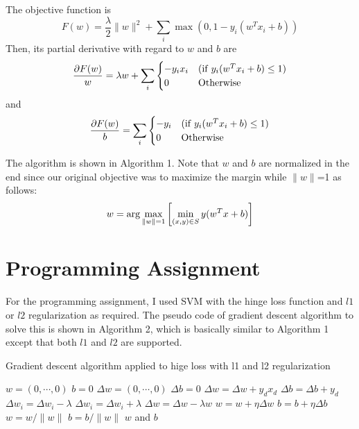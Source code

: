\begin{enumerate}
\begin{enumerate}
The objective function is
\[
F(w)=\frac{\lambda}{2}\|w\|^2+\sum_i \max{(0, 1-y_i (w^Tx_i+b))}
\]
Then, its partial derivative with regard to $w$ and $b$ are
\[
\frac{\partial F(w)}{w}=\lambda w+ \sum_i
\begin{cases}
-y_i x_i & ({\rm if} \; y_i(w^Tx_i+b) \le 1) \\
0 & {\rm Otherwise}
\end{cases}
\]
and
\[
\frac{\partial F(w)}{b}=\sum_i
\begin{cases}
-y_i & ({\rm if} \; y_i(w^Tx_i+b) \le 1) \\
0 & {\rm Otherwise}
\end{cases}
\]

The algorithm is shown in Algorithm 1. Note that $w$ and $b$ are normalized in the end since our original objective was to maximize the margin while $\|w\|$=1 as follows:
\[
w={\rm arg}\max_{\|w\|=1} \left[ \min_{(x,y)\in S} y(w^T x+b) \right]
\]



\end{enumerate}

\end{enumerate}

\section{Programming Assignment}

For the programming assignment, I used SVM with the hinge loss function and $l1$ or $l2$ regularization as required. The pseudo code of gradient descent algorithm to solve this is shown in Algorithm 2, which is basically similar to Algorithm 1 except that both $l1$ and $l2$ are supported.

\begin{algorithm}
\caption{Gradient descent algorithm applied to hige loss with l1 and l2 regularization}\label{euclid}
\begin{algorithmic}[1]
\State $w=(0, \cdots, 0)$
\State $b=0$
\State $\Delta w=(0, \cdots, 0)$
\State $\Delta b=0$
\State $\Delta w= \Delta w+y_d x_d$
\State $\Delta b=\Delta b+y_d$
\EndIf
\EndFor
{}
\State $\Delta w_i=\Delta w_i-\lambda$
\Else
\State $\Delta w_i=\Delta w_i+\lambda$
\EndIf
\EndFor
{}
\State $\Delta w=\Delta w - \lambda w$
\EndIf
\State $w=w+\eta \Delta w$
\State $b=b+\eta \Delta b$
\EndFor
\State $w=w/\|w\|$
\State $b=b/\|w\|$
\State \Return $w$ and $b$
\EndProcedure
\end{algorithmic}
\end{algorithm}

